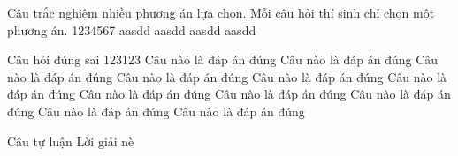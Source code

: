 \documentclass[14pt]{extarticle}
\begin{document}
\begin{khuvuc}{Câu trắc nghiệm nhiều phương án lựa chọn. Mỗi câu hỏi thí sinh chỉ chọn một phương án.}
\CauTracNghiem
{1234567}
{aasdd}
{aasdd}
{aasdd}
{\Dung aasdd}
\end{khuvuc}
%
\begin{khuvuc}{Câu hỏi đúng sai}
	\CauDungSai
	{123123}
	{\Dung Câu nào là đáp án đúng Câu nào là đáp án đúng}
	{\Sai Câu nào là đáp án đúng Câu nào là đáp án đúng}
	{\Dung Câu nào là đáp án đúng Câu nào là đáp án đúng}
	{\Sai Câu nào là đáp án đúng Câu nào là đáp án đúng Câu nào là đáp án đúng Câu nào là đáp án đúng Câu nào là đáp án đúng}
\end{khuvuc}
%
\begin{khuvuc}{Câu tự luận}
		{Lời giải nè}

\end{khuvuc}
\cuoidethi
\end{document}
